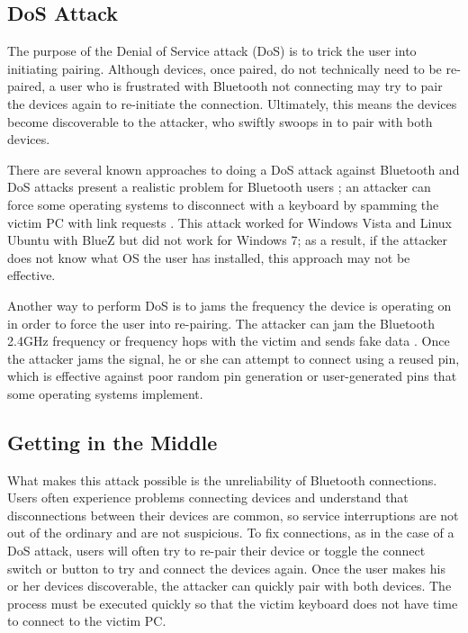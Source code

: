 \documentclass{acm_proc_article-sp}
\begin{document}
\subsection{DoS Attack}
The purpose of the Denial of Service attack (DoS) is to trick the user into initiating pairing. Although devices, once paired, do not technically need to be re-paired, a user who is frustrated with Bluetooth not connecting may try to pair the devices again to re-initiate the connection. Ultimately, this means the devices become discoverable to the attacker, who swiftly swoops in to pair with both devices. 

There are several known approaches to doing a DoS attack against Bluetooth and DoS attacks present a realistic problem for Bluetooth users \cite{bandyopadhyay2010information}; an attacker can force some operating systems to disconnect with a keyboard by spamming the victim PC with link requests \cite{cuthbertbluetooth}. This attack worked for Windows Vista and Linux Ubuntu with BlueZ but did not work for Windows 7; as a result, if the attacker does not know what OS the user has installed, this approach may not be effective. 

Another way to perform DoS is to jams the frequency the device is operating on in order to force the user into re-pairing. The attacker can jam the Bluetooth 2.4GHz frequency or frequency hops with the victim and sends fake data \cite{4401672}. Once the attacker jams the signal, he or she can attempt to connect using a reused pin\cite{barnickel2012implementing}, which is effective against poor random pin generation or user-generated pins that some operating systems implement. 

\subsection{Getting in the Middle}
What makes this attack possible is the unreliability of Bluetooth connections. Users often experience problems connecting devices and understand that disconnections between their devices are common, so service interruptions are not out of the ordinary and are not suspicious. To fix connections, as in the case of a DoS attack, users will often try to re-pair their device or toggle the connect switch or button to try and connect the devices again. Once the user makes his or her devices discoverable, the attacker can quickly pair with both devices. The process must be executed quickly so that the victim keyboard does not have time to connect to the victim PC. 
\end{document}
